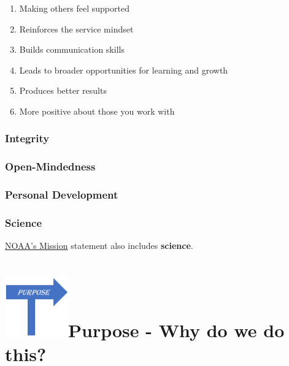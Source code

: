 \documentclass[
  letterpaper,
  DIV=11,
  numbers=noendperiod]{scrreprt}
\providecommand{\tightlist}{%
  \setlength{\itemsep}{0pt}\setlength{\parskip}{0pt}}\usepackage{longtable,booktabs,array}
\begin{document}
\begin{enumerate}
\def\labelenumi{\arabic{enumi}.}
\tightlist
\item
  Making others feel supported\\
\item
  Reinforces the service mindset\\
\item
  Builds communication skills\\
\item
  Leads to broader opportunities for learning and growth\\
\item
  Produces better results\\
\item
  More positive about those you work with
\end{enumerate}

\subsubsection{Integrity}\label{integrity}

\subsubsection{Open-Mindedness}\label{open-mindedness}

\subsubsection{Personal Development}\label{personal-development}

\subsubsection{Science}\label{science}

\href{https://www.noaa.gov/our-mission-and-vision}{NOAA's Mission}
statement also includes \textbf{science}.

\section[Purpose - Why do we do
this?]{\texorpdfstring{\protect\includegraphics[width=\textwidth,height=1.04167in]{_img/purpose_icon.png}Purpose
- Why do we do
this?}{Purpose - Why do we do this?}}\label{purpose---why-do-we-do-this}
\end{document}
